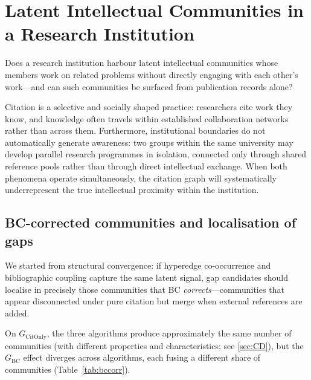 \section{Latent Intellectual Communities in a Research Institution}
\label{sec:Q}
Does a research institution harbour latent intellectual communities whose members work on related problems without directly engaging with each other's work---and can such communities be surfaced from publication records alone?

Citation is a selective and socially shaped practice: researchers cite work they know, and knowledge often travels within established collaboration networks rather than across them. Furthermore, institutional boundaries do not automatically generate awareness: two groups within the same university may develop parallel research programmes in isolation, connected only through shared reference pools rather than through direct intellectual exchange. When both phenomena operate simultaneously, the citation graph will systematically underrepresent the true intellectual proximity within the institution.

\subsection{BC-corrected communities and localisation of gaps}
\label{subsec:q:bccorr}

We started from structural convergence: if hyperedge co-occurrence and bibliographic coupling capture the same latent signal, gap candidates should localise in precisely those communities that BC \emph{corrects}---communities that appear disconnected under pure citation but merge when external references are added.

On $G_\text{CitOnly}$, the three algorithms produce approximately the same number of communities (with different properties and characteristics; see \ref{sec:CD}), but the $G_\text{BC}$ effect diverges across algorithms, each fusing a different share of communities (Table~\ref{tab:bccorr}). 


